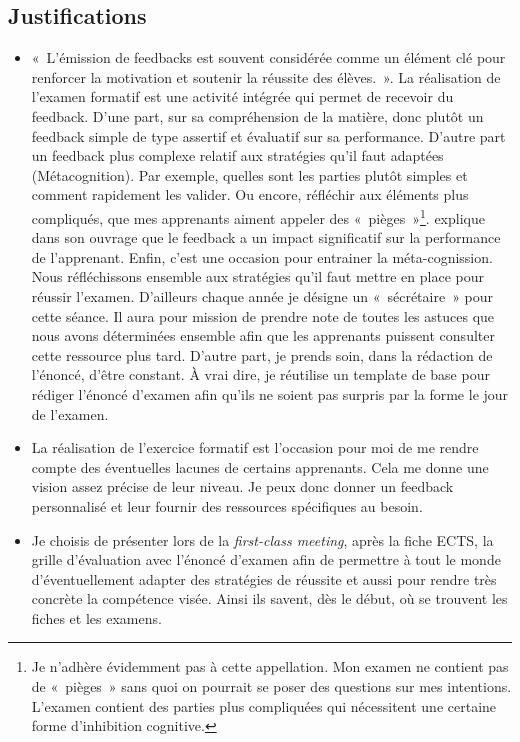 \subsection{Justifications}
\label{evaluation_des_apprentissages_justifications}
\begin{itemize}
    \item «~L’émission de feedbacks est souvent considérée comme un élément clé pour renforcer la motivation et soutenir la réussite des élèves.~»\cite{georges2011feedbacks}. La réalisation de l'examen formatif est une activité intégrée qui permet de recevoir du feedback. D'une part, sur sa compréhension de la matière, donc plutôt un feedback simple de type assertif et évaluatif\cite{georges2011feedbacks} sur sa performance. D'autre part un feedback plus complexe relatif aux stratégies qu'il faut adaptées (Métacognition). Par exemple, quelles sont les parties plutôt simples et comment rapidement les valider. Ou encore, réfléchir aux éléments plus compliqués, que mes apprenants aiment appeler des «~pièges~»\footnote{Je n'adhère évidemment pas à cette appellation. Mon examen ne contient pas de «~pièges~» sans quoi on pourrait se poser des questions sur mes intentions. L'examen contient des parties plus compliquées qui nécessitent une certaine forme d'inhibition cognitive.}. \citet{hattie2008visible} explique dans son ouvrage que le feedback a un impact significatif sur la performance de l'apprenant. Enfin, c'est une occasion pour entrainer la méta-cognission\cite{leclercq2008modele}. Nous réfléchissons ensemble aux stratégies qu'il faut mettre en place pour réussir l'examen. D'ailleurs chaque année je désigne un «~sécrétaire~» pour cette séance. Il aura pour mission de prendre note de toutes les astuces que nous avons déterminées ensemble afin que les apprenants puissent consulter cette ressource plus tard. D'autre part, je prends soin, dans la rédaction de l'énoncé, d'être constant. À vrai dire, je réutilise un template de base pour rédiger l'énoncé d’examen afin qu’ils ne soient pas surpris par la forme le jour de l'examen.
    \item La réalisation de l'exercice formatif est l'occasion pour moi de me rendre compte des éventuelles lacunes de certains apprenants. Cela me donne une vision assez précise de leur niveau. Je peux donc donner un feedback personnalisé et leur fournir des ressources spécifiques au besoin.
    \item Je choisis de présenter lors de la \textit{first-class meeting}, après la fiche ECTS, la grille d'évaluation avec l'énoncé d'examen afin de permettre à tout le monde d'éventuellement adapter des stratégies de réussite et aussi pour rendre très concrète la compétence visée. Ainsi ils savent, dès le début, où se trouvent les fiches et les examens.
\end{itemize}

